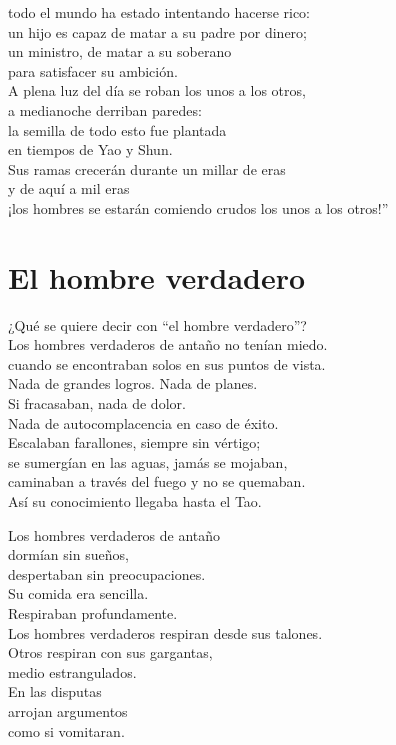 \documentclass[hidelinks]{memoir}
\begin{document}
	todo el mundo ha estado intentando hacerse rico:\\
	un hijo es capaz de matar a su padre por dinero;\\
	un ministro, de matar a su soberano\\
	para satisfacer su ambición.\\
	A plena luz del día se roban los unos a los otros,\\
	a medianoche derriban paredes:\\
	la semilla de todo esto fue plantada\\
	en tiempos de Yao y Shun.\\
	Sus ramas crecerán durante un millar de eras\\
	y de aquí a mil eras\\
	¡los hombres se estarán comiendo crudos los unos a los otros!''
	
	\chapter*{El hombre verdadero}
	
	¿Qué se quiere decir con ``el hombre verdadero''?\\
	Los hombres verdaderos de antaño no tenían miedo.\\
	cuando se encontraban solos en sus puntos de vista.\\
	Nada de grandes logros. Nada de planes.\\
	Si fracasaban, nada de dolor.\\
	Nada de autocomplacencia en caso de éxito.\\
	Escalaban farallones, siempre sin vértigo;\\
	se sumergían en las aguas, jamás se mojaban,\\
	caminaban a través del fuego y no se quemaban.\\
	Así su conocimiento llegaba hasta el Tao.
	
	Los hombres verdaderos de antaño\\
	dormían sin sueños,\\
	despertaban sin preocupaciones.\\
	Su comida era sencilla.\\
	Respiraban profundamente.\\
	Los hombres verdaderos respiran desde sus talones.\\
	Otros respiran con sus gargantas,\\
	medio estrangulados.\\
	En las disputas\\
	arrojan argumentos\\
	como si vomitaran.
	
\end{document}
